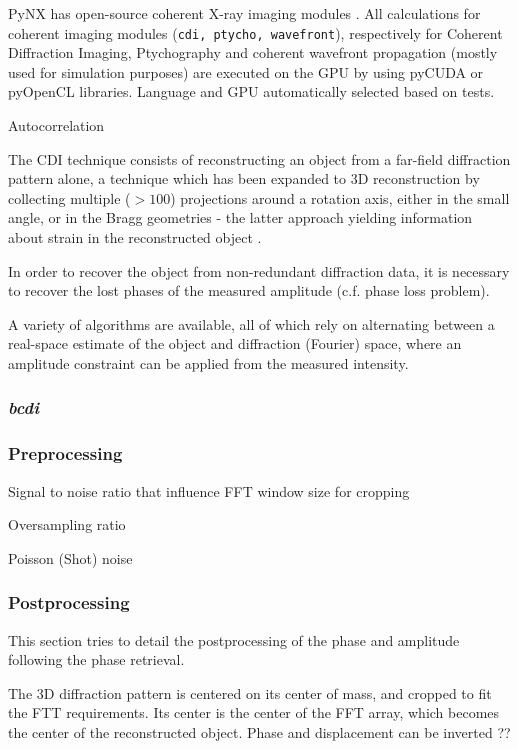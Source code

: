 PyNX has open-source coherent X-ray imaging modules \parencite{Favre-Nicolin2020}. All calculations for coherent imaging modules (\texttt{cdi, ptycho, wavefront}), respectively for Coherent Diffraction Imaging, Ptychography and coherent wavefront propagation (mostly used for simulation purposes) are executed on the GPU by using pyCUDA or pyOpenCL libraries. Language and GPU automatically selected based on tests.

Autocorrelation

The CDI technique consists of reconstructing an object from a far-field diffraction pattern alone, a technique which has been expanded to 3D reconstruction by collecting multiple ($>100$) projections around a rotation axis, either in the small angle, or in the Bragg geometries - the latter approach yielding information about strain in the reconstructed object \parencite{Li2020}.

In order to recover the object from non-redundant diffraction data, it is necessary to recover the lost phases of the measured amplitude (c.f. phase loss problem).

A variety of algorithms are available, all of which rely on alternating between a real-space estimate of the object and diffraction (Fourier) space, where an amplitude constraint can be applied from the measured intensity.


\subsubsection{\textit{bcdi}}

\subsubsection{Preprocessing}

Signal to noise ratio that influence FFT window size for cropping

Oversampling ratio

Poisson (Shot) noise 

\subsubsection{Postprocessing}

This section tries to detail the postprocessing of the phase and amplitude following the phase retrieval.

The 3D diffraction pattern is centered on its center of mass, and cropped to fit the FTT requirements. Its center is the center of the FFT array, which becomes the center of the reconstructed object. Phase and displacement can be inverted ??

